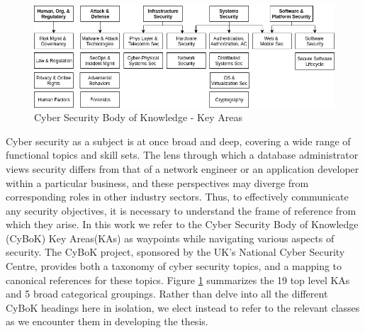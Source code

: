 


\begin{figure}[ht]
\centering
\includegraphics[width=.75\linewidth]{resource/img/ch_intro/taxonomies/cybok_vert_no_heading.png}
\caption{Cyber Security Body of Knowledge - Key Areas \cite{Rashid_Chivers_Danezis_Lupu_Martin}}
\label{fig:intro:cybok}
\end{figure} 



Cyber security as a subject is at once broad and deep, covering a wide range of functional topics and skill sets. The lens through which a database administrator views security differs from that of a network engineer or an application developer within a particular business, and these perspectives may diverge from corresponding roles in other industry sectors. Thus, to effectively communicate any security objectives, it is necessary to understand the frame of reference from which they arise. In this work we refer to the Cyber Security Body of Knowledge\cite{Rashid_Chivers_Danezis_Lupu_Martin} (CyBoK) Key  Areas(KAs) as waypoints while navigating various aspects of security. The CyBoK project, sponsored by the UK's National Cyber Security Centre, provides both a taxonomy of cyber security topics, and a mapping to canonical references for these topics. Figure \ref{fig:intro:cybok} summarizes the 19 top level KAs and 5 broad categorical groupings.  Rather than delve into all the different CyBoK headings here in isolation, we elect instead to refer to the relevant classes as we encounter them in developing the thesis. 

